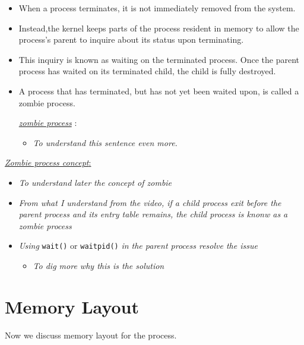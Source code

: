 \documentclass[12pt,a4paper]{book}
\begin{document}
\begin{itemize}

\item When a process terminates, it is not immediately removed from the system. 

\item Instead,the kernel keeps parts of the process resident in memory to allow the process’s parent to inquire about its status upon terminating. 


\item This inquiry is known as waiting on the terminated process. Once the parent process has waited on its terminated child, the
child is fully destroyed. 



\item A process that has terminated, but has not yet been waited upon, is called a zombie process.

 \underline{\textit{zombie process}} :
	
	\begin{itemize}
	\item \textit{To understand this sentence even more.}
	\end{itemize}

\end{itemize}


 \underline{\textit{Zombie process concept}:} 

\begin{itemize}

\item \textit{To understand later the concept of zombie}

\item \textit{From what I understand from the video, if a child process exit before the parent process and its entry table remains, the child process is knonw as a zombie process}

\item \textit{Using} \verb|wait()| or \verb|waitpid()| \textit{in the parent process resolve the issue}

	\begin{itemize}
	\item \textit{To dig more why this is the solution}
	\end{itemize}

\end{itemize}

\newpage
\section{Memory Layout}
Now we discuss memory layout for the process.
\end{document}
